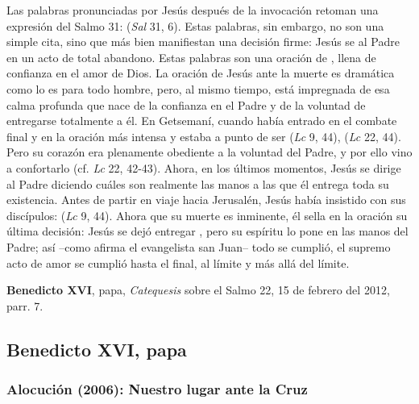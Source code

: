 \begin{patercite}
Las palabras pronunciadas por Jesús después de la invocación  retoman una expresión del Salmo 31:  (\textit{Sal} 31, 6). Estas palabras, sin embargo, no son una simple cita, sino que más bien manifiestan una decisión firme: Jesús se  al Padre en un acto de total abandono. Estas palabras son una oración de , llena de confianza en el amor de Dios. La oración de Jesús ante la muerte es dramática como lo es para todo hombre, pero, al mismo tiempo, está impregnada de esa calma profunda que nace de la confianza en el Padre y de la voluntad de entregarse totalmente a él. En Getsemaní, cuando había entrado en el combate final y en la oración más intensa y estaba a punto de ser  (\textit{Lc} 9, 44),  (\textit{Lc} 22, 44). Pero su corazón era plenamente obediente a la voluntad del Padre, y por ello  vino a confortarlo (cf. \textit{Lc} 22, 42-43). Ahora, en los últimos momentos, Jesús se dirige al Padre diciendo cuáles son realmente las manos a las que él entrega toda su existencia. Antes de partir en viaje hacia Jerusalén, Jesús había insistido con sus discípulos:  (\textit{Lc} 9, 44). Ahora que su muerte es inminente, él sella en la oración su última decisión: Jesús se dejó entregar , pero su espíritu lo pone en las manos del Padre; así --como afirma el evangelista san Juan-- todo se cumplió, el supremo acto de amor se cumplió hasta el final, al límite y más allá del límite.

\textbf{Benedicto XVI}, papa, \textit{Catequesis} sobre el Salmo 22, 15 de febrero del 2012, parr. 7. 
\end{patercite}

\newsection
\subsection{Benedicto XVI, papa}

\subsubsection{Alocución (2006): Nuestro lugar ante la Cruz}

